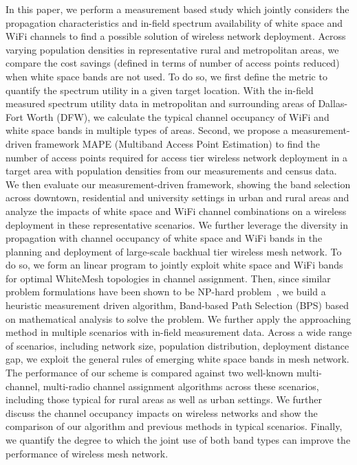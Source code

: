 In this paper, we perform a measurement based study which jointly considers the propagation 
characteristics and in-field spectrum availability of white space and WiFi channels to find 
a possible solution of wireless network deployment. Across varying population densities in 
representative rural and metropolitan areas, we compare the cost savings (defined in terms 
of number of access points reduced) when white space bands are not used. To do so, we first 
define the metric to quantify the spectrum utility in a given target location. With the in-field 
measured spectrum utility data in metropolitan and surrounding areas of Dallas-Fort Worth (DFW), 
we calculate the typical channel occupancy of WiFi and white space bands in multiple types of areas. 
Second, we propose a measurement-driven framework MAPE (Multiband Access Point Estimation) to find 
the number of access points required for access tier wireless network deployment in a target area 
with population densities from our measurements and census data. We then evaluate our measurement-driven 
framework, showing the band selection across downtown, residential and university settings in 
urban and rural areas and analyze the impacts of white space and WiFi channel combinations on a 
wireless deployment in these representative scenarios. We further leverage the diversity in propagation 
with channel occupancy of white space and WiFi bands in the planning and deployment of large-scale 
backhual tier wireless mesh network. To do so, we form an linear program to jointly exploit white 
space and WiFi bands for optimal WhiteMesh topologies in channel assignment. Then, since similar 
problem formulations have been shown to be NP-hard problem~\cite{jain2005impact,doraghinejad2014channel}, 
we build a heuristic measurement driven algorithm, Band-based Path Selection (BPS) based on mathematical 
analysis to solve the problem. We further apply the approaching method in multiple scenarios with 
in-field measurement data. Across a wide range of scenarios, including network size, population 
distribution, deployment distance gap, we exploit the general rules of emerging white space bands 
in mesh network. The performance of our scheme is compared against two well-known multi-channel, 
multi-radio channel assignment algorithms across these scenarios, including those typical for rural 
areas as well as urban settings. We further discuss the channel occupancy impacts on wireless networks 
and show the comparison of our algorithm and previous methods in typical scenarios. Finally, we quantify 
the degree to which the joint use of both band types can improve the performance of wireless mesh network.

